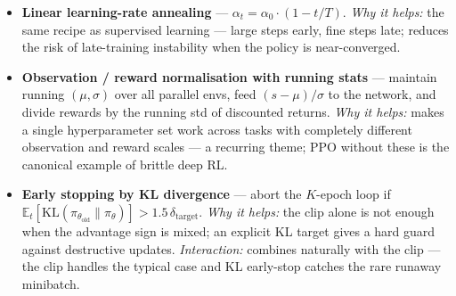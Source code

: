 \documentclass[11pt]{article}
\begin{document}
\begin{itemize}
  \emph{Engstrom et al., 2020} and \emph{Andrychowicz et al., 2021}).
\item
  \label{trick-4-7-6}\textbf{Linear learning-rate
  annealing} --- \(\alpha_t = \alpha_0 \cdot (1 - t/T)\). \emph{Why it
  helps:} the same recipe as supervised learning --- large steps early,
  fine steps late; reduces the risk of late-training instability when
  the policy is near-converged.
\item
  \label{trick-4-7-7}\textbf{Observation / reward
  normalisation with running stats} --- maintain running
  \((\mu, \sigma)\) over all parallel envs, feed \((s-\mu)/\sigma\) to
  the network, and divide rewards by the running std of discounted
  returns. \emph{Why it helps:} makes a single hyperparameter set work
  across tasks with completely different observation and reward scales
  --- a recurring theme; PPO without these is the canonical example of
  brittle deep RL.
\item
  \label{trick-4-7-8}\textbf{Early stopping by KL
  divergence} --- abort the \(K\)-epoch loop if
  \(\mathbb{E}_t[\mathrm{KL}(\pi_{\theta_\text{old}} \| \pi_\theta)] > 1.5\,\delta_\text{target}\).
  \emph{Why it helps:} the clip alone is not enough when the advantage
  sign is mixed; an explicit KL target gives a hard guard against
  destructive updates. \emph{Interaction:} combines naturally with the
  clip --- the clip handles the typical case and KL early-stop catches
  the rare runaway minibatch.
\end{itemize}

    \label{pseudo-4-7}
\end{document}
